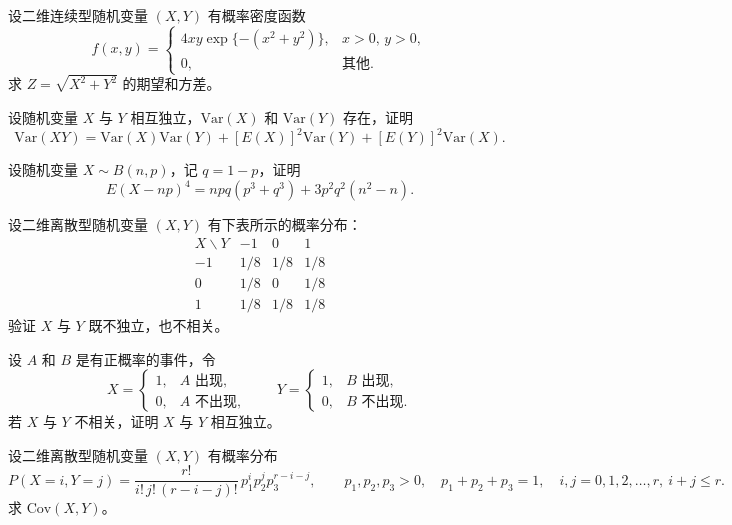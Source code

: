 \begin{homework}[3.22]
设二维连续型随机变量 $(X,Y)$ 有概率密度函数
\[
f(x,y)=
\begin{cases}
4xy\exp\{-(x^2+y^2)\}, & x>0,\,y>0,\\[4pt]
0, & \text{其他}.
\end{cases}
\]
求 $Z=\sqrt{X^2+Y^2}$ 的期望和方差。
\end{homework}

\begin{homework}[3.23]
设随机变量 $X$ 与 $Y$ 相互独立，$\mathrm{Var}(X)$ 和 $\mathrm{Var}(Y)$ 存在，证明
\[
\mathrm{Var}(XY)
=\mathrm{Var}(X)\mathrm{Var}(Y)
+[E(X)]^2\mathrm{Var}(Y)
+[E(Y)]^2\mathrm{Var}(X).
\]
\end{homework}

\begin{homework}[3.24]
设随机变量 $X\sim B(n,p)$，记 $q=1-p$，证明
\[
E(X-np)^4
=npq(p^3+q^3)+3p^2q^2(n^2-n).
\]
\end{homework}

\begin{homework}[3.25]
设二维离散型随机变量 $(X,Y)$ 有下表所示的概率分布：
\[
\begin{array}{c|ccc}
  X \backslash Y & -1 & 0 & 1 \\ \hline
  -1 & 1/8 & 1/8 & 1/8 \\
   0 & 1/8 & 0   & 1/8 \\
   1 & 1/8 & 1/8 & 1/8
\end{array}
\]
验证 $X$ 与 $Y$ 既不独立，也不相关。
\end{homework}

\begin{homework}[3.26]
设 $A$ 和 $B$ 是有正概率的事件，令
\[
X=
\begin{cases}
1, & A\text{ 出现},\\
0, & A\text{ 不出现},
\end{cases}
\qquad
Y=
\begin{cases}
1, & B\text{ 出现},\\
0, & B\text{ 不出现}.
\end{cases}
\]
若 $X$ 与 $Y$ 不相关，证明 $X$ 与 $Y$ 相互独立。
\end{homework}

\begin{homework}[3.27]
设二维离散型随机变量 $(X,Y)$ 有概率分布
\[
P(X=i,Y=j)
=\frac{r!}{i!\,j!\,(r-i-j)!}\,p_1^i p_2^j p_3^{r-i-j},
\qquad
p_1,p_2,p_3>0,\quad p_1+p_2+p_3=1,\quad i,j=0,1,2,\ldots,r,\ i+j\le r.
\]
求 $\mathrm{Cov}(X,Y)$。
\end{homework}


